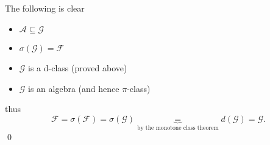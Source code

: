 \documentclass{unswmaths}
\begin{document}
\subsection{}
The following is clear
\begin{itemize}
    \item $ \mathcal{A} \subseteq \mathcal{G} $ 
    \item $ \sigma(\mathcal{G}) = \mathcal{F} $
    \item $ \mathcal{G} $ is a d-class (proved above)
    \item $ \mathcal{G} $ is an algebra (and hence $ \pi$-class)
\end{itemize}
    thus $$ \mathcal{F} = \sigma(\mathcal{F}) = \sigma(\mathcal{G}) \underbrace{=}_{\text{by the monotone class theorem}} d(\mathcal{G}) = \mathcal{G}. $$
    \qed
\section{}
\end{document}
